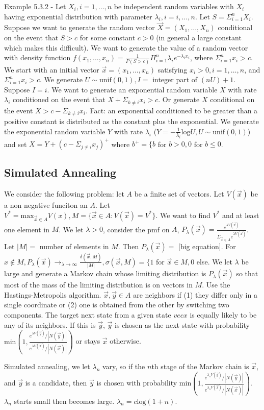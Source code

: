 \documentclass{article}
\begin{document}
Example 5.3.2 - Let $X_i, i = 1, \dots, n$ be independent random variables with $X_i$ having exponential distribution with parameter $\lambda_i, i = i, \dots, n$. Let $S = \Sigma_{i=1}^n X_i$. Suppose we want to generate the random vector $\vec{X} = (X_1, \dots, X_n)$ conditional on the event that $S > c$ for some constant $c > 0$ (in general a large constant which makes this difficult). We want to generate the value of a random vector with density function $f(x_1, \dots, x_n) = \frac{1}{P(S > c)} \Pi_{i=1}^n \lambda_i e^{-\lambda_i x_i}$, where $\Sigma_{i=1}^n x_i > c$. We start with an initial vector $\vec{x} = (x_1, \dots, x_n)$ satisfying $x_i > 0, i = 1, \dots, n$, and $\Sigma_{i=1}^n x_i > c$. We generate $U \sim \mathrm{unif}(0, 1), I =$ integer part of $(nU)+1$. Suppose $I = i$. We want to generate an exponential random variable $X$ with rate $\lambda_i$ conditioned on the event that $X + \Sigma_{k \ne i} x_i > c$. Or generate $X$ conditional on the event $X > c - \Sigma_{k \ne i} x_i$. Fact: an exponential conditioned to be greater than a positive constant is distributed as the constant plus the exponential. We generate the exponential random variable $Y$ with rate $\lambda_i$ ($Y = - \frac{1}{\lambda_i} \mathrm{log} U, U \sim \mathrm{unif}(0, 1)$) and set $X = Y + (c - \Sigma_{j \ne i} x_j)^+$ where $b^+ = \{b$ for $b > 0, 0$ for $b \le 0$.

\subsection{Simulated Annealing}

We consider the following problem: let $A$ be a finite set of vectors. Let $V(\vec{x})$ be a non negative funciton an $A$. Let $V^* = \mathrm{max}_{\vec{x} \in A} V(x), M = \{\vec{x} \in A: V(\vec{x}) = V^*\}$. We want to find $V^*$ and at least one element in $M$. We let $\lambda > 0$, consider the pmf on $A$, $P_\lambda (\vec{x}) = \frac{e^{\lambda V(\vec{x})}}{\Sigma_{\vec{x} \in A} e^{\lambda V(\vec{x})}}$. Let $|M| =$ number of elements in $M$. Then $P_\lambda(\vec{x}) =$ [big equation]. For $x \not \in M, P_\lambda(\vec{x}) \rightarrow_{\lambda \rightarrow \infty} \frac{\delta(\vec{x}, M)}{|M|}, \sigma(\vec{x}, M) = \{1$ for $\vec{x} \in M, 0$ else. We let $\lambda$ be large and generate a Markov chain whose limiting distribution is $P_\lambda(\vec{x})$ so that most of the mass of the limiting distribution is on vectors in $M$. Use the Hastings-Metropolis algorithm. $\vec{x}, \vec{y} \in A$ are neighbors if (1) they differ only in a single coordinate or (2) one is obtained from the other by switching two components. The target next state from a given state $vec{x}$ is equally likely to be any of its neighbors. If this is $\vec{y}$, $\vec{y}$ is chosen as the next state with probability $\mathrm{min}(1, \frac{e^{\lambda V(\vec{y})} / |N(\vec{y})|}{e^{\lambda V(\vec{x})} / |N(\vec{x})|})$ or stays $\vec{x}$ otherwise.

Simulated annealing, we let $\lambda_n$ vary, so if the $n$th stage of the Markov chain is $\vec{x}$, and $\vec{y}$ is a candidate, then $\vec{y}$ is chosen with probability $\mathrm{min}(1, \frac{e^{\lambda_n V(\vec{y})} / |N(\vec{y})|}{e^{\lambda_n V(\vec{x})} / |N(\vec{x})|})$. $\lambda_n$ starts small then becomes large. $\lambda_n = c \mathrm{log}(1+n)$.
\end{document}
